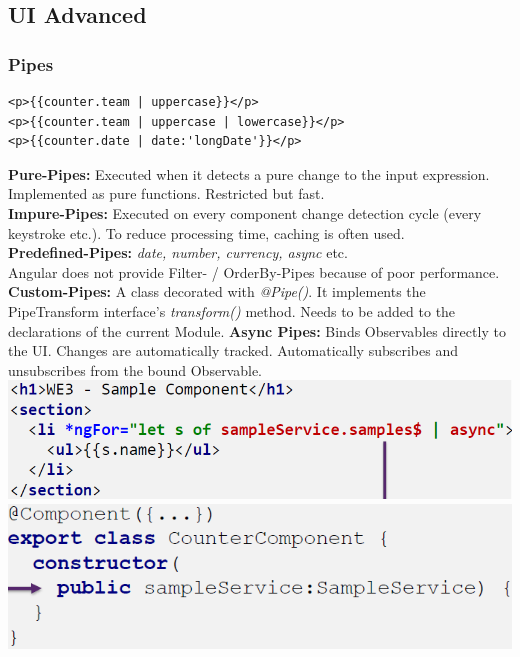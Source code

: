\subsection{UI Advanced}
\subsubsection{Pipes}
\begin{lstlisting}
<p>{{counter.team | uppercase}}</p>
<p>{{counter.team | uppercase | lowercase}}</p>
<p>{{counter.date | date:'longDate'}}</p>
\end{lstlisting}
\textbf{Pure-Pipes:} Executed when it detects a pure change to the input expression.
Implemented as pure functions. Restricted but fast.\\
\textbf{Impure-Pipes:} Executed on every component change detection cycle (every keystroke etc.).
To reduce processing time, caching is often used.\\
\textbf{Predefined-Pipes:} \textit{date, number, currency, async} etc.\\
Angular does not provide Filter- / OrderBy-Pipes because of poor performance.\\
\textbf{Custom-Pipes:} A class decorated with \textit{@Pipe()}.
It implements the PipeTransform interface's \textit{transform()} method.
Needs to be added to the declarations of the current Module.
\textbf{Async Pipes:} Binds Observables directly to the UI.
Changes are automatically tracked.
Automatically subscribes and unsubscribes from the bound Observable.\\
\includegraphics[width=0.6\linewidth]{img/angular_async_pipes.png}
\includegraphics[width=0.4\linewidth]{img/angular_async_pipes2.png}


